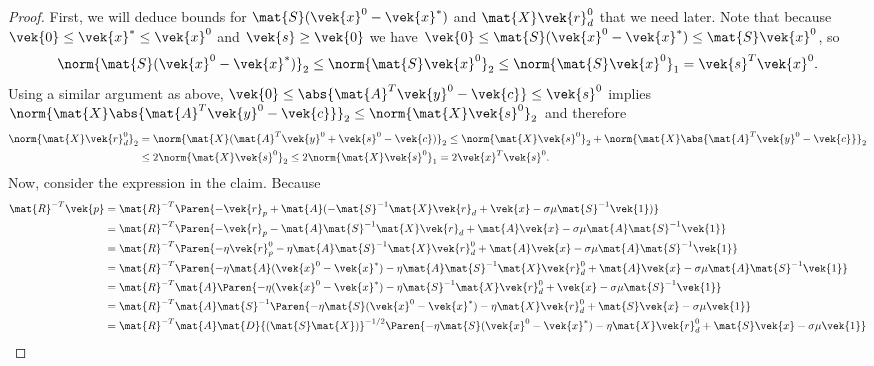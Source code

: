 \begin{proof}
  First, we will deduce bounds for \(\mat{S}(\vek{x}^0 - \vek{x}^*)\) and \(\mat{X}\vek{r}_d^0\) that we need later.
  Note that because \(\vek{0} \leq \vek{x}^* \leq \vek{x}^0\) and \(\vek{s} \geq \vek{0}\) we have \(\vek{0} \leq \mat{S}(\vek{x}^0 - \vek{x}^*) \leq \mat{S}\vek{x}^0 \), so
  \[
    \norm{\mat{S}(\vek{x}^0 - \vek{x}^*)}_2
    \leq \norm{\mat{S}\vek{x}^0}_2
    \leq \norm{\mat{S}\vek{x}^0}_1
    = \vek{s}^T \vek{x}^0.
  \]
  Using a similar argument as above, \(\vek{0} \leq \abs{\mat{A}^T \vek{y}^0 - \vek{c}} \leq \vek{s}^0\) implies \(\norm{\mat{X} \abs{\mat{A}^T \vek{y}^0 - \vek{c}}}_2 \leq \norm{\mat{X}\vek{s}^0}_2\) and therefore
  \begin{align*}
    \norm{\mat{X}\vek{r}_d^0}_2
    &= \norm{\mat{X}(\mat{A}^T \vek{y}^0 + \vek{s}^0 - \vek{c})}_2
    \leq \norm{\mat{X}\vek{s}^0}_2 + \norm{\mat{X} \abs{\mat{A}^T \vek{y}^0 - \vek{c}}}_2 \\
    &\leq 2 \norm{\mat{X}\vek{s}^0}_2
    \leq 2 \norm{\mat{X}\vek{s}^0}_1
    = 2 \vek{x}^T \vek{s}^0.
  \end{align*}
  Now, consider the expression in the claim. Because
  \begin{align*}
    \mat{R}^{-T}\vek{p}
    &= \mat{R}^{-T}\Paren{-\vek{r}_p + \mat{A} ( -\mat{S}^{-1} \mat{X} \vek{r}_d + \vek{x} - \sigma \mu \mat{S}^{-1} \vek{1} )} \\
    &= \mat{R}^{-T}\Paren{-\vek{r}_p -\mat{A}\mat{S}^{-1}\mat{X} \vek{r}_d + \mat{A}\vek{x} - \sigma \mu \mat{A}\mat{S}^{-1} \vek{1} } \\
    &= \mat{R}^{-T}\Paren{-\eta \vek{r}_p^0 - \eta \mat{A}\mat{S}^{-1}\mat{X} \vek{r}_d^0 + \mat{A}\vek{x} - \sigma \mu \mat{A}\mat{S}^{-1} \vek{1} } \\
    &= \mat{R}^{-T}\Paren{- \eta \mat{A}(\vek{x}^0 - \vek{x}^*) - \eta \mat{A}\mat{S}^{-1}\mat{X} \vek{r}_d^0 + \mat{A}\vek{x} - \sigma \mu \mat{A}\mat{S}^{-1} \vek{1} } \\
    &= \mat{R}^{-T}\mat{A}\Paren{- \eta (\vek{x}^0 - \vek{x}^*) - \eta \mat{S}^{-1}\mat{X} \vek{r}_d^0 + \vek{x} - \sigma \mu \mat{S}^{-1} \vek{1} } \\
    &= \mat{R}^{-T}\mat{A}\mat{S}^{-1}\Paren{- \eta \mat{S}(\vek{x}^0 - \vek{x}^*) - \eta \mat{X} \vek{r}_d^0 + \mat{S}\vek{x} - \sigma \mu \vek{1} } \\
    &= \mat{R}^{-T}\mat{A}\mat{D}{(\mat{S}\mat{X})}^{-1/2}\Paren{- \eta \mat{S}(\vek{x}^0 - \vek{x}^*) - \eta \mat{X} \vek{r}_d^0 + \mat{S}\vek{x} - \sigma \mu \vek{1} }

\end{align*}
\end{proof}

